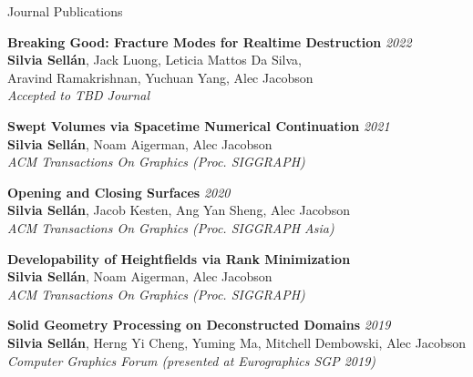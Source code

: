 \documentclass{resume} %
\begin{document}
\begin{rSection}{Journal Publications}

{\bf Breaking Good: Fracture Modes for Realtime Destruction} \hfill {\em 2022} \\ 
\textbf{Silvia Sellán}, Jack Luong, Leticia Mattos Da Silva, \\Aravind Ramakrishnan, Yuchuan Yang, Alec Jacobson\\
{\it Accepted to TBD Journal}

{\bf Swept Volumes via Spacetime Numerical Continuation} \hfill {\em 2021} \\ 
\textbf{Silvia Sellán}, Noam Aigerman, Alec Jacobson\\
{\it ACM Transactions On Graphics (Proc. SIGGRAPH)}

{\bf Opening and Closing Surfaces} \hfill {\em 2020} \\ 
\textbf{Silvia Sellán}, Jacob Kesten, Ang Yan Sheng, Alec Jacobson\\
{\it ACM Transactions On Graphics (Proc. SIGGRAPH Asia)}

{\bf Developability of Heightfields via Rank Minimization} \\ 
\textbf{Silvia Sellán}, Noam Aigerman, Alec Jacobson\\
{\it ACM Transactions On Graphics (Proc. SIGGRAPH)}

{\bf Solid Geometry Processing on Deconstructed Domains} \hfill {\em 2019} \\ 
\textbf{Silvia Sellán}, Herng Yi Cheng, Yuming Ma, Mitchell Dembowski, Alec Jacobson\\
{\it Computer Graphics Forum (presented at Eurographics SGP 2019)}
\end{rSection}
\end{document}
